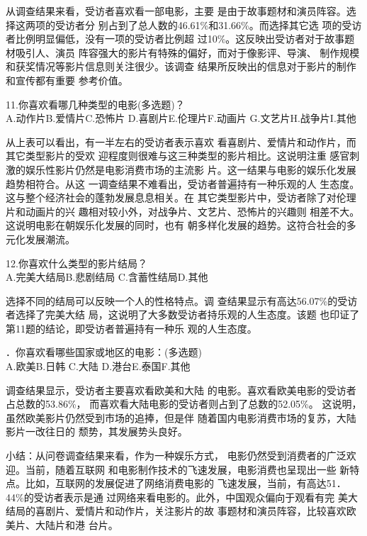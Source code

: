 \documentclass[12pt,twoside]{article}
\newcommand{\heiti}{\CJKfamily{heiti}\enhei}
\begin{document}
从调查结果来看，受访者喜欢看一部电影，主要
是由于故事题材和演员阵容。选择这两项的受访者分
别占到了总人数的46.61\%和31.66\%。而选择其它选
项的受访者比例明显偏低，没有一项的受访者比例超
过10\%。这反映出受访者对于故事题材吸引人、演员
阵容强大的影片有特殊的偏好，而对于像影评、导演、
制作规模和获奖情况等影片信息则关注很少。该调查
结果所反映出的信息对于影片的制作和宣传都有重要
参考价值。
\par\noindent 11.你喜欢看哪几种类型的电影(多选题)？\\
A.动作片\tabskips  B.爱情片\tabskips C.恐怖片\tabskips
D.喜剧片\tabskips E.伦理片\tabskips F.动画片\tabskips
G.文艺片\tabskips H.战争片\tabskips I.其他

\par 从上表可以看出，有一半左右的受访者表示喜欢
看喜剧片、爱情片和动作片，而其它类型影片的受欢
迎程度则很难与这三种类型的影片相比。这说明注重
感官刺激的娱乐性影片仍然是电影消费市场的主流影
片。这一结果与电影的娱乐化发展趋势相符合。从这
一调查结果不难看出，受访者普遍持有一种乐观的人
生态度。这与整个经济社会的蓬勃发展息息相关。在
其它类型影片中，受访者除了对伦理片和动画片的兴
趣相对较小外，对战争片、文艺片、恐怖片的兴趣则
相差不大。这说明电影在朝娱乐化发展的同时，也有
朝多样化发展的趋势。这符合社会的多元化发展潮流。

\par\noindent 12.你喜欢什么类型的影片结局？\\
A.完美大结局\tabskips B.悲剧结局 \tabskips
C.含蓄性结局\tabskips D.其他

\par 选择不同的结局可以反映一个人的性格特点。调
查结果显示有高达56.07\%的受访者选择了完美大结
局，这说明了大多数受访者持乐观的人生态度。该题
也印证了第11题的结论，即受访者普遍持有一种乐
观的人生态度。

\par{}．你喜欢看哪些国家或地区的电影：(多选题)\\
A.欧美\tabskips B.日韩 \tabskips C.大陆\tabskips
D.港台\tabskips E.泰国\tabskips F.其他
\par 调查结果显示，受访者主要喜欢看欧美和大陆
的电影。喜欢看欧美电影的受访者占总数的53.86\%，
而喜欢看大陆电影的受访者则占到了总数的52.05\%。
这说明，虽然欧美影片仍然受到市场的追捧，但是伴
随着国内电影消费市场的复苏，大陆影片一改往日的
颓势，其发展势头良好。
\par {\heiti 小结：从问卷调查结果来看，作为一种娱乐方式，
电影仍然受到消费者的广泛欢迎。当前，随着互联网
和电影制作技术的飞速发展，电影消费也呈现出一些
新特点。比如，互联网的发展促进了网络消费电影的
飞速发展，当前，有高达51．44\%的受访者表示是通
过网络来看电影的。此外，中国观众偏向于观看有完
美大结局的喜剧片、爱情片和动作片，关注影片的故
事题材和演员阵容，比较喜欢欧美片、大陆片和港
台片。}
\end{document}
